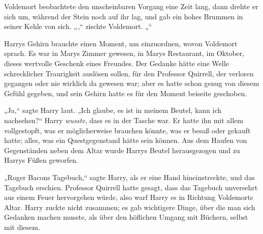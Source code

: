 Voldemort beobachtete den unscheinbaren Vorgang eine Zeit lang, dann drehte er sich um, während der Stein noch auf ihr lag, und gab ein hohes Brummen in seiner Kehle von sich.
„,“ zischte Voldemort. „“

Harrys Gehirn brauchte einen Moment, um einzuordnen, wovon Voldemort sprach.
Es war in Marys Zimmer gewesen, in Marys Restaurant, im Oktober, dieses wertvolle Geschenk eines Freundes. Der Gedanke hätte eine Welle schrecklicher Traurigkeit auslösen sollen, für den Professor Quirrell, der verloren gegangen oder nie wirklich da gewesen war; aber es hatte schon genug von diesem Gefühl gegeben, und sein Gehirn hatte es für den Moment beiseite geschoben.

„Ja,“ sagte Harry laut. „Ich glaube, es ist in meinem Beutel, kann ich nachsehen?“
Harry \emph{wusste}, dass es in der Tasche war. Er hatte ihn mit allem vollgestopft, was er möglicherweise brauchen könnte, was er besaß oder gekauft hatte; alles, was ein Questgegenstand hätte sein können.
Aus dem Haufen von Gegenständen neben dem Altar wurde Harrys Beutel herausgezogen und zu Harrys Füßen geworfen.

„Roger Bacons Tagebuch,“ sagte Harry, als er eine Hand hineinstreckte, und das Tagebuch erschien. Professor Quirrell hatte gesagt, dass das Tagebuch unversehrt aus einem Feuer hervorgehen würde, also warf Harry es in Richtung Voldemorts Altar.
Harry zuckte nicht zusammen; es gab wichtigere Dinge, über die man sich Gedanken machen musste, als über den höflichen Umgang mit Büchern, selbst mit diesem.

